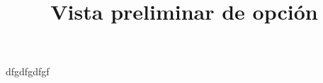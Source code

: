 \documentclass[a4paper,10pt]{article}\usepackage[utf8]{inputenc}\usepackage[spanish]{babel}\usepackage{times}
\title{Vista preliminar de opción}
\begin{document}
\twocolumn 

\maketitle

dfgdfgdfgf
\end{document}
